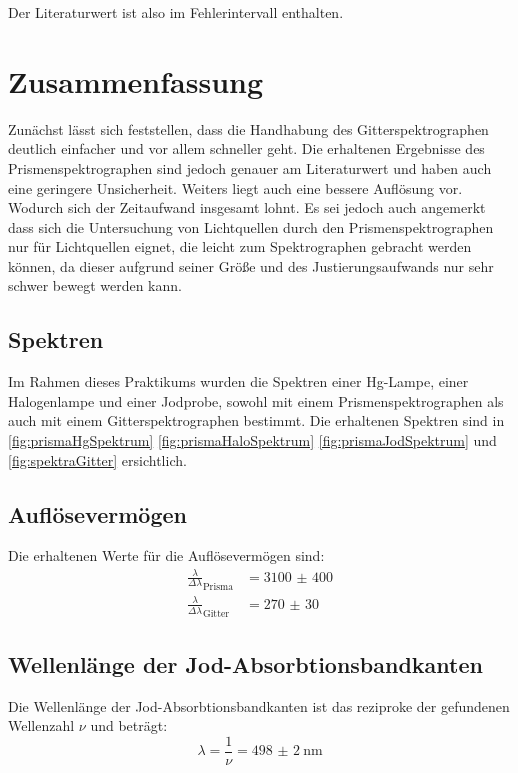 \documentclass[12pt,english,ngerman]{scrartcl}
\begin{document}
Der Literaturwert ist also im Fehlerintervall enthalten.

\newpage

\section{Zusammenfassung}\label{sec:zs}
Zunächst lässt sich feststellen, dass die Handhabung des Gitterspektrographen
deutlich einfacher und vor allem schneller geht. Die erhaltenen Ergebnisse des
Prismenspektrographen sind jedoch genauer am Literaturwert und haben auch eine
geringere Unsicherheit. Weiters liegt auch eine bessere Auflösung vor. Wodurch
sich der Zeitaufwand insgesamt lohnt. Es sei jedoch auch angemerkt dass sich
die Untersuchung von Lichtquellen durch den Prismenspektrographen nur für
Lichtquellen eignet, die leicht zum Spektrographen gebracht werden können, da
dieser aufgrund seiner Größe und des Justierungsaufwands nur sehr schwer bewegt
werden kann.

\subsection{Spektren}

Im Rahmen dieses Praktikums wurden die Spektren einer Hg-Lampe, einer
Halogenlampe und einer Jodprobe, sowohl mit einem Prismenspektrographen als
auch mit einem Gitterspektrographen bestimmt. Die erhaltenen Spektren sind in
\autoref{fig:prismaHgSpektrum} \autoref{fig:prismaHaloSpektrum}
\autoref{fig:prismaJodSpektrum} und \autoref{fig:spektraGitter} ersichtlich.

\subsection{Auflösevermögen}

Die erhaltenen Werte für die Auflösevermögen sind:
\begin{align*}
	\frac{\lambda}{\Delta\lambda}_\text{Prisma} & = \num{3100(400)} \\
	\frac{\lambda}{\Delta\lambda}_\text{Gitter} & = \num{270(30)}
\end{align*}

\subsection{Wellenlänge der Jod-Absorbtionsbandkanten}

Die Wellenlänge der Jod-Absorbtionsbandkanten ist das reziproke der gefundenen
Wellenzahl $\nu$ und beträgt:
\begin{equation*}
	\lambda = \frac{1}{\nu} = \SI{498(2)}{\nano\meter}
\end{equation*}
\end{document}
